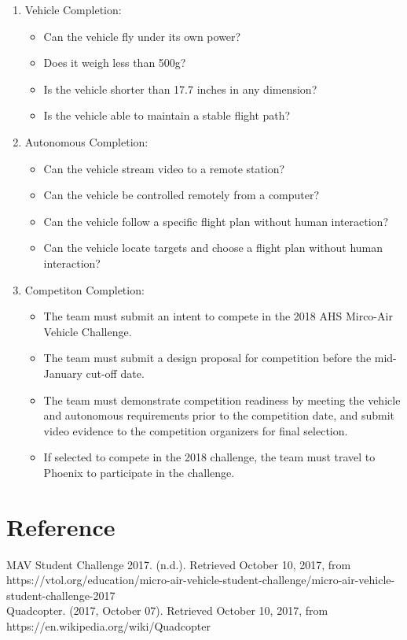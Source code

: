 \documentclass[10pt,letterpaper,onecolumn]{article}
\begin{document}
\begin{enumerate}
\item Vehicle Completion:
\begin{itemize}
\item Can the vehicle fly under its own power?
\item Does it weigh less than 500g?
\item Is the vehicle shorter than 17.7 inches in any dimension?
\item Is the vehicle able to maintain a stable flight path?
\end{itemize}
\item Autonomous Completion:
\begin{itemize}
\item Can the vehicle stream video to a remote station?
\item Can the vehicle be controlled remotely from a computer?
\item Can the vehicle follow a specific flight plan without human interaction?
\item Can the vehicle locate targets and choose a flight plan without human
interaction?
\end{itemize}
\item Competiton Completion:
\begin{itemize}
\item The team must submit an intent to compete in the 2018 AHS Mirco-Air Vehicle
Challenge.
\item The team must submit a design proposal for competition before the mid-
January cut-off date.
\item The team must demonstrate competition readiness by meeting the vehicle and
autonomous requirements prior to the competition date, and submit video evidence
to the competition organizers for final selection.
\item If selected to compete in the 2018 challenge, the team must travel to
Phoenix to participate in the challenge.
\end{itemize}
\end{enumerate}

\section{Reference}
MAV Student Challenge 2017. (n.d.). Retrieved October 10, 2017, from https://vtol.org/education/micro-air-vehicle-student-challenge/micro-air-vehicle-student-challenge-2017\\
Quadcopter. (2017, October 07). Retrieved October 10, 2017, from https://en.wikipedia.org/wiki/Quadcopter
\end{document}
